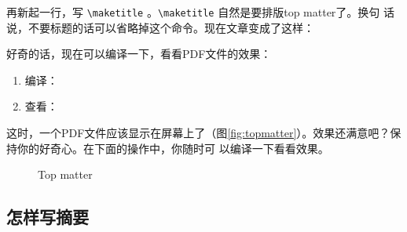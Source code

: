 再新起一行，写 \verb|\maketitle| 。\verb|\maketitle| 自然是要排版top matter了。换句
话说，不要标题的话可以省略掉这个命令。现在文章变成了这样：
\begin{codeblock}[.9]
\end{codeblock}
好奇的话，现在可以编译一下，看看PDF文件的效果：

\begin{enumerate}
\item 编译：\quad{}
\item 查看：
\end{enumerate}

这时，一个PDF文件应该显示在屏幕上了（图\ref{fig:topmatter}）。效果还满意吧？保持你的好奇心。在下面的操作中，你随时可
以编译一下看看效果。

\begin{figure}
  \centering
  \quad
  \caption{Top matter}
\end{figure}

\subsection{怎样写摘要}

